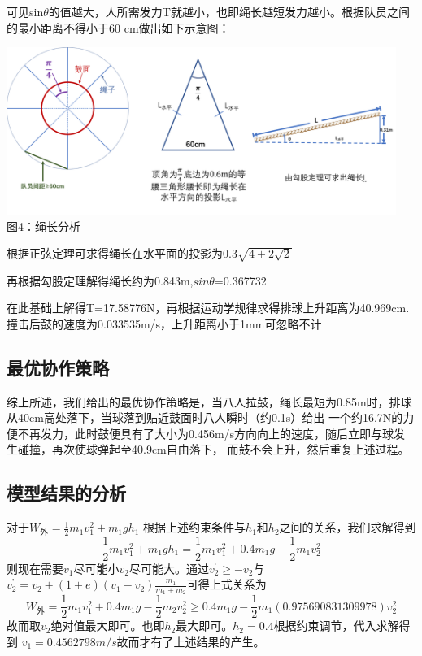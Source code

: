\documentclass[UTF8]{article}
\begin{document}
可见sin$\theta$的值越大，人所需发力T就越小，也即绳长越短发力越小。根据队员之间的最小距离不得小于60 cm做出如下示意图：
\begin{center}
    \includegraphics[width=0.95\textwidth]{figure4.png}\\ 
    图4：绳长分析  
\end{center}
根据正弦定理可求得绳长在水平面的投影为$0.3\sqrt{4+2\sqrt{2}}$

再根据勾股定理解得绳长约为0.843m,$sin\theta$=0.367732

在此基础上解得T=17.58776‬N，再根据运动学规律求得排球上升距离为40.969cm.
撞击后鼓的速度为0.033535m/s，上升距离小于1mm可忽略不计

\subsection{最优协作策略}
综上所述，我们给出的最优协作策略是，当八人拉鼓，绳长最短为0.85m时，排球从40cm高处落下，当球落到贴近鼓面时八人瞬时（约0.1s）给出
一个约16.7N的力便不再发力，此时鼓便具有了大小为0.456m/s方向向上的速度，随后立即与球发生碰撞，再次使球弹起至40.9cm自由落下，
而鼓不会上升，然后重复上述过程。

\subsection{模型结果的分析}
对于$W_{\mbox{外}}=\frac{1}{2}m_1v_1^2+m_1gh_1$
根据上述约束条件与$h_1$和$h_2$之间的关系，我们求解得到
\begin{equation}
    \frac{1}{2}m_1v_1^2+m_1gh_1=\frac{1}{2}m_1v_1^2+0.4m_1g-\frac{1}{2}m_1v_2^2
\end{equation}
则现在需要$v_1$尽可能小$v_2$尽可能大。通过$v_2^{\mbox{'}}\ge-v_2$与$v_2^{\mbox{'}}=v_2+(1+e)(v_1-v_2)\frac{m_1}{m_1+m_2}$可得上式关系为
\begin{equation}
    W_{\mbox{外}}=\frac{1}{2}m_1v_1^2+0.4m_1g-\frac{1}{2}m_2v_2^2\ge0.4m_1g-\frac{1}{2}m_1(0.975690831309978)v_2^2
\end{equation}
故而取$v_2$绝对值最大即可。也即$h_2$最大即可。$h_2=0.4$根据约束调节，代入求解得到
$v_1=0.4562798m/s$故而才有了上述结果的产生。
\end{document}
